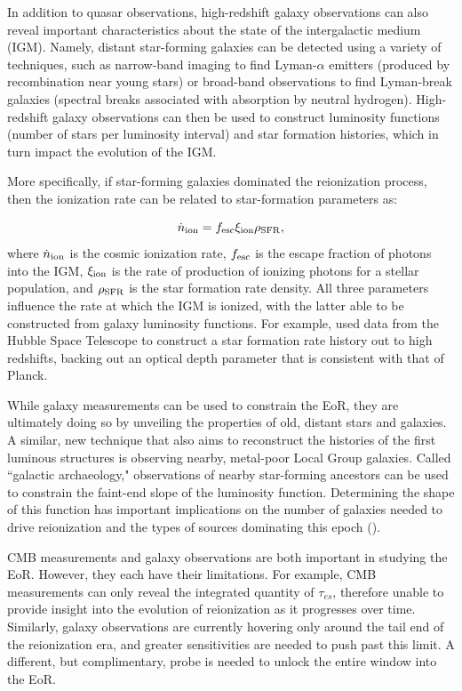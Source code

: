 In addition to quasar observations, high-redshift galaxy observations can also reveal important characteristics about the state of the intergalactic medium (IGM). Namely, distant star-forming galaxies can be detected using a variety of techniques, such as narrow-band imaging to find Lyman-$\alpha$ emitters (produced by recombination near young stars) or broad-band observations to find Lyman-break galaxies (spectral breaks associated with absorption by neutral hydrogen). High-redshift galaxy observations can then be used to construct luminosity functions (number of stars per luminosity interval) and star formation histories, which in turn impact the evolution of the IGM. 

More specifically, if star-forming galaxies dominated the reionization process, then the ionization rate can be related to star-formation parameters as:

\begin{equation}
\dot{n}_{\rm ion} = f_{\rm esc}\xi_{\rm ion}\rho_{\rm SFR},
\end{equation}
where $\dot{n}_{\rm ion}$ is the cosmic ionization rate, $f_{\rm esc}$ is the escape fraction of photons into the IGM, $\xi_{\rm ion}$ is the rate of production of ionizing photons for a stellar population, and $\rho_{\rm SFR}$ is the star formation rate density. All three parameters influence the rate at which the IGM is ionized, with the latter able to be constructed from galaxy luminosity functions. For example, \citet{robertson_et_al2015} used data from the Hubble Space Telescope to construct a star formation rate history out to high redshifts, backing out an optical depth parameter that is consistent with that of Planck. 

While galaxy measurements can be used to constrain the EoR, they are ultimately doing so by unveiling the properties of old, distant stars and galaxies. A similar, new technique that also aims to reconstruct the histories of the first luminous structures is observing nearby, metal-poor Local Group galaxies. Called ``galactic archaeology," observations of nearby star-forming ancestors can be used to constrain the faint-end slope of the luminosity function. Determining the shape of this function has important implications on the number of galaxies needed to drive reionization and the types of sources dominating this epoch (\citealt{weisz2017}). 

CMB measurements and galaxy observations are both important in studying the EoR. However, they each have their limitations. For example, CMB measurements can only reveal the integrated quantity of $\tau_{es}$, therefore unable to provide insight into the evolution of reionization as it progresses over time. Similarly, galaxy observations are currently hovering only around the tail end of the reionization era, and greater sensitivities are needed to push past this limit. A different, but complimentary, probe is needed to unlock the entire window into the EoR.


